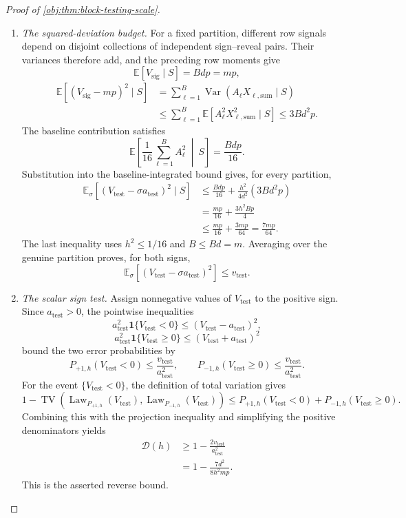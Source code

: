 \documentclass[11pt]{article}
\begin{document}
\begin{proof}[Proof of \cref{obj:thm:block-testing-scale}]
\begin{enumerate}
\item \textit{The squared-deviation budget.}
For a fixed partition, different row signals depend on disjoint collections of independent sign--reveal pairs. Their variances therefore add, and the preceding row moments give
\[
\mathbb E[V_{\mathrm{sig}}\mid S]=Bdp=mp,
\]
\[
\begin{aligned}
\mathbb E[(V_{\mathrm{sig}}-mp)^2\mid S]
&=
\sum_{\ell=1}^{B}
\operatorname{Var}(A_\ell X_{\ell,\mathrm{sum}}\mid S)\\
&\le
\sum_{\ell=1}^{B}
\mathbb E[A_\ell^2X_{\ell,\mathrm{sum}}^2\mid S]
\le3Bd^2p.
\end{aligned}
\]
The baseline contribution satisfies
\[
\mathbb E\!\left[\frac1{16}\sum_{\ell=1}^{B}A_\ell^2
\ \middle|\ S\right]
=\frac{Bdp}{16}.
\]
Substitution into the baseline-integrated bound gives, for every partition,
\[
\begin{aligned}
\mathbb E_\sigma[
(V_{\mathrm{test}}-\sigma a_{\mathrm{test}})^2\mid S]
&\le
\frac{Bdp}{16}
+\frac{h^2}{4d^2}(3Bd^2p)\\
&=
\frac{mp}{16}+\frac{3h^2Bp}{4}\\
&\le
\frac{mp}{16}+\frac{3mp}{64}
=\frac{7mp}{64}.
\end{aligned}
\]
The last inequality uses \(h^2\le1/16\) and \(B\le Bd=m\). Averaging over the genuine partition proves, for both signs,
\[
\mathbb E_\sigma[
(V_{\mathrm{test}}-\sigma a_{\mathrm{test}})^2]
\le v_{\mathrm{test}}.
\]

\item \textit{The scalar sign test.}
Assign nonnegative values of \(V_{\mathrm{test}}\) to the positive sign. Since \(a_{\mathrm{test}}>0\), the pointwise inequalities
\[
a_{\mathrm{test}}^2\mathbf1\{V_{\mathrm{test}}<0\}
\le(V_{\mathrm{test}}-a_{\mathrm{test}})^2,
\]
\[
a_{\mathrm{test}}^2\mathbf1\{V_{\mathrm{test}}\ge0\}
\le(V_{\mathrm{test}}+a_{\mathrm{test}})^2
\]
bound the two error probabilities by
\[
P_{+1,h}(V_{\mathrm{test}}<0)
\le\frac{v_{\mathrm{test}}}{a_{\mathrm{test}}^2},
\qquad
P_{-1,h}(V_{\mathrm{test}}\ge0)
\le\frac{v_{\mathrm{test}}}{a_{\mathrm{test}}^2}.
\]
For the event \(\{V_{\mathrm{test}}<0\}\), the definition of total variation gives
\[
1-\operatorname{TV}\!\left(
\operatorname{Law}_{P_{+1,h}}(V_{\mathrm{test}}),
\operatorname{Law}_{P_{-1,h}}(V_{\mathrm{test}})
\right)
\le
P_{+1,h}(V_{\mathrm{test}}<0)
+
P_{-1,h}(V_{\mathrm{test}}\ge0).
\]
Combining this with the projection inequality and simplifying the positive denominators yields
\[
\begin{aligned}
\mathcal D(h)
&\ge1-\frac{2v_{\mathrm{test}}}{a_{\mathrm{test}}^2}\\
&=
1-\frac{7d^2}{8h^2mp}.
\end{aligned}
\]
This is the asserted reverse bound.


\end{enumerate}
\end{proof}
\end{document}
